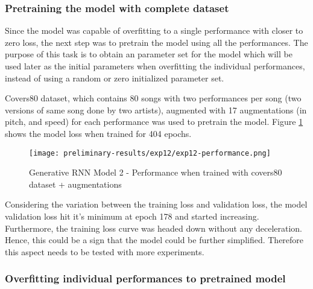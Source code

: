 \documentclass[../main.tex]{subfiles}
\begin{document}
\iffalse
\begin{figure}[H]
    \centering
    \texttt{[image: preliminary-results/exp10/exp10-performance.png]}
    \caption{Generative RNN Model 2 - Performance}
    \label{fig:exp10-performance}
\end{figure}
\fi

\subsubsection{Pretraining the model with complete dataset}

\par
Since the model was capable of overfitting to a single performance with closer to zero loss, the next step was to pretrain the model using all the performances. The purpose of this task is to obtain an parameter set for the model which will be used later as the initial parameters when overfitting the individual performances, instead of using a random or zero initialized parameter set.

\par
Covers80 dataset, which contains 80 songs with two performances per song (two versions of same song done by two artists), augmented with 17 augmentations (in pitch, and speed) for each performance was used to pretrain the model. Figure \ref{fig:exp12-performance} shows the model loss when trained for 404 epochs. 

\begin{figure}[H]
    \centering
    \texttt{[image: preliminary-results/exp12/exp12-performance.png]}
    \caption{Generative RNN Model 2 - Performance when trained with covers80 dataset + augmentations}
    \label{fig:exp12-performance}
\end{figure}

\par
Considering the variation between the training loss and validation loss, the model validation loss hit it's minimum at epoch 178 and started increasing. Furthermore, the training loss curve was headed down without any deceleration. Hence, this could be a sign that the model could be further simplified. Therefore this aspect needs to be tested with more experiments.



\subsubsection{Overfitting individual performances to pretrained model}
\end{document}
